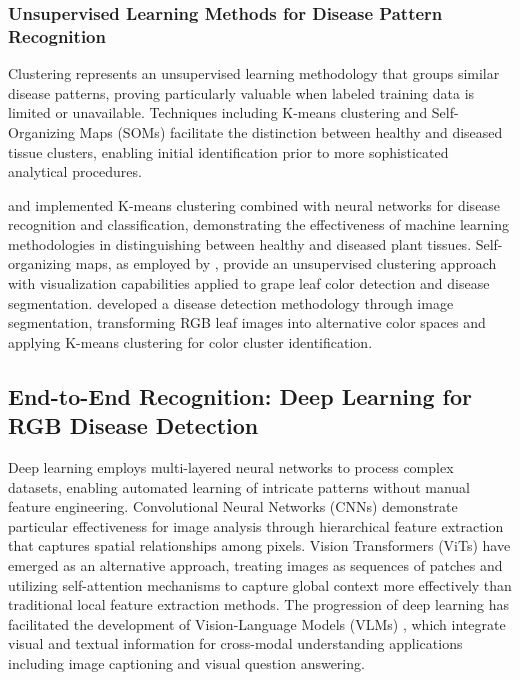 \documentclass[sn-mathphys]{sn-jnl}
\theoremstyle{thmstyleone}%
\theoremstyle{thmstyletwo}%
\theoremstyle{thmstylethree}%
\begin{document}
\subsubsection{Unsupervised Learning Methods for Disease Pattern Recognition}

Clustering represents an unsupervised learning methodology that groups similar disease patterns, proving particularly valuable when labeled training data is limited or unavailable. Techniques including K-means clustering and Self-Organizing Maps (SOMs) facilitate the distinction between healthy and diseased tissue clusters, enabling initial identification prior to more sophisticated analytical procedures.

\citet{alhiary2011fast} and \citet{bagde2015artificial} implemented K-means clustering combined with neural networks for disease recognition and classification, demonstrating the effectiveness of machine learning methodologies in distinguishing between healthy and diseased plant tissues. Self-organizing maps, as employed by \citet{meunkaewjinda2008grape}, provide an unsupervised clustering approach with visualization capabilities applied to grape leaf color detection and disease segmentation. \citet{jaware2012crop} developed a disease detection methodology through image segmentation, transforming RGB leaf images into alternative color spaces and applying K-means clustering for color cluster identification.



\subsection{End-to-End Recognition: Deep Learning for RGB Disease Detection}

Deep learning employs multi-layered neural networks to process complex datasets, enabling automated learning of intricate patterns without manual feature engineering. Convolutional Neural Networks (CNNs) demonstrate particular effectiveness for image analysis through hierarchical feature extraction that captures spatial relationships among pixels. Vision Transformers (ViTs) have emerged as an alternative approach, treating images as sequences of patches and utilizing self-attention mechanisms to capture global context more effectively than traditional local feature extraction methods. The progression of deep learning has facilitated the development of Vision-Language Models (VLMs) \citep{radford2021learning}, which integrate visual and textual information for cross-modal understanding applications including image captioning and visual question answering.
\end{document}
